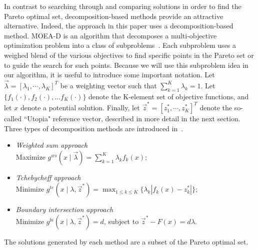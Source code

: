 \documentclass{article}
\begin{document}

In contrast to searching through and comparing solutions in order to find the Pareto optimal set, decomposition-based methods provide an attractive alternative.  
Indeed, the approach in this paper uses a decomposition-based method.  
MOEA-D is an algorithm that decomposes a multi-objective optimization problem into a class of subproblems~\cite{4358754}.  
Each subproblem uses a weighed blend of the various objectives to find specific points in the Pareto set or to guide the search for such points.  
Because we  will use this subproblem idea in our algorithm, it is useful to introduce some important notation.
Let $ \vec{\lambda} = [ \lambda_{1} , \cdots , \lambda_{K}  ]^{T} $ be a weighting vector such that $ \sum_{k=1}^{K} \lambda_{k} = 1 $.  Let $\{f_1(\cdot), f_2(\cdot), ... f_{K}(\cdot)\}$ denote the K-element set of objective functions, and let $x$ denote a potential solution.  Finally, let $ \vec{z}^{*} = [z^{*}_{1}, \cdots , z^{*}_{K}]^{T} $ denote the so-called ``Utopia" reference vector, described in more detail in the next section. 
Three types of decomposition methods are introduced in~\cite{4358754}.
\begin{itemize}
\item \emph{Weighted sum approach} \\
Maximize $ g^{ws} (x \mid \vec{\lambda}) = \sum_{k=1}^{K} \lambda_{k} f_{k} (x) $;
\item \emph{Tchebycheff approach} \\
Minimize $ g^{te} (x \mid \lambda , \vec{z}^{*}) = \max_{1 \leq k \leq K}  \{ \lambda_{k} | f_{k}(x) - z^{*}_{k}  | \} $;
\item \emph{Boundary intersection approach} \\
Minimize $ g^{bi} (x \mid \lambda , \vec{z}^{*} ) = d $, subject to $ \vec{z}^{*} - F(x) = d \lambda $.
\end{itemize}
The solutions generated by each method are a subset of the Pareto optimal set.
\end{document}
